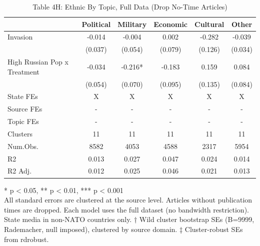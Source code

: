 \begin{table}[!t]
\caption{Table 4H: Ethnic By Topic, Full Data (Drop No-Time Articles)} 
\fontsize{12.0pt}{14.4pt}\selectfont
\begin{tabular*}{\linewidth}{@{\extracolsep{\fill}}lccccc}
\toprule
  & Political & Military & Economic & Cultural & Other \\ 
\midrule\addlinespace[2.5pt]
Invasion & -0.014 & -0.004 & 0.002 & -0.282 & -0.039 \\ 
 & (0.037) & (0.054) & (0.079) & (0.126) & (0.034) \\ 
High Russian Pop x Treatment & -0.034 & -0.216* & -0.183 & 0.159 & 0.084 \\ 
{} & {(0.054)} & {(0.070)} & {(0.095)} & {(0.135)} & {(0.084)} \\ 
State FEs & X & X & X & X & X \\ 
Source FEs & - & - & - & - & - \\ 
Topic FEs & - & - & - & - & - \\ 
Clusters & 11 & 11 & 11 & 11 & 11 \\ 
Num.Obs. & 8582 & 4053 & 4588 & 2317 & 5954 \\ 
R2 & 0.013 & 0.027 & 0.047 & 0.024 & 0.014 \\ 
R2 Adj. & 0.012 & 0.025 & 0.046 & 0.021 & 0.013 \\ 
\bottomrule
\end{tabular*}
\begin{minipage}{\linewidth}
* p < 0.05, ** p < 0.01, *** p < 0.001\\
All standard errors are clustered at the source level. Articles without
publication times are dropped. Each model uses the full dataset (no bandwidth
restriction). State media in non-NATO countries only. † Wild cluster bootstrap
SEs (B=9999, Rademacher, null imposed), clustered by source domain. ‡
Cluster-robust SEs from rdrobust.\\
\end{minipage}
\end{table}

